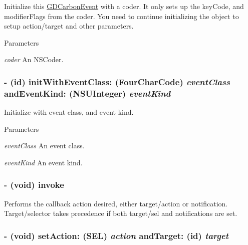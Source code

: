 Initialize this \hyperlink{interface_g_d_carbon_event}{GDCarbonEvent} with a coder. It only sets up the keyCode, and modifierFlags from the coder. You need to continue initializing the object to setup action/target and other parameters.


\begin{DoxyParams}{Parameters}
\item[{\em coder}]An NSCoder. \end{DoxyParams}
\hypertarget{interface_g_d_carbon_event_a8826878465bd97dd2aab07a7cef13b40}{
\subsubsection[{initWithEventClass:andEventKind:}]{\setlength{\rightskip}{0pt plus 5cm}-\/ (id) initWithEventClass: (FourCharCode) {\em eventClass}\/ andEventKind: (NSUInteger) {\em eventKind}}}
\label{interface_g_d_carbon_event_a8826878465bd97dd2aab07a7cef13b40}


Initialize with event class, and event kind. 
\begin{DoxyParams}{Parameters}
\item[{\em eventClass}]An event class. \item[{\em eventKind}]An event kind. \end{DoxyParams}
\hypertarget{interface_g_d_carbon_event_a4639c12245fe48e533ec792b3f89d90e}{
\subsubsection[{invoke}]{\setlength{\rightskip}{0pt plus 5cm}-\/ (void) invoke }}
\label{interface_g_d_carbon_event_a4639c12245fe48e533ec792b3f89d90e}


Performs the callback action desired, either target/action or notification. Target/selector takes precedence if both target/sel and notifications are set. \hypertarget{interface_g_d_carbon_event_af2ae15b5b721c80a99c6fd84fc5fc23e}{
\subsubsection[{setAction:andTarget:}]{\setlength{\rightskip}{0pt plus 5cm}-\/ (void) setAction: (SEL) {\em action}\/ andTarget: (id) {\em target}}}
\label{interface_g_d_carbon_event_af2ae15b5b721c80a99c6fd84fc5fc23e}


